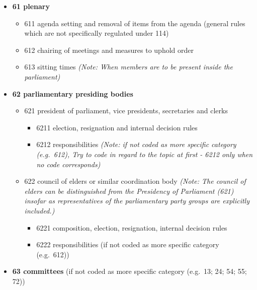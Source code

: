\documentclass[]{article}
\providecommand{\tightlist}{%
  \setlength{\itemsep}{0pt}\setlength{\parskip}{0pt}}
\begin{document}
\begin{itemize}
\tightlist
\item
  \textbf{61 plenary}

  \begin{itemize}
  \tightlist
  \item
    611 agenda setting and removal of items from the agenda (general
    rules which are not specifically regulated under 114)
  \item
    612 chairing of meetings and measures to uphold order
  \item
    613 sitting times \emph{(Note: When members are to be present inside
    the parliament)}
  \end{itemize}
\item
  \textbf{62 parliamentary presiding bodies}

  \begin{itemize}
  \tightlist
  \item
    621 president of parliament, vice presidents, secretaries and clerks

    \begin{itemize}
    \tightlist
    \item
      6211 election, resignation and internal decision rules
    \item
      6212 responsibilities \emph{(Note: if not coded as more specific
      category (e.g.~612), Try to code in regard to the topic at first -
      6212 only when no code corresponds)}
    \end{itemize}
  \item
    622 council of elders or similar coordination body \emph{(Note: The
    council of elders can be distinguished from the Presidency of
    Parliament (621) insofar as representatives of the parliamentary
    party groups are explicitly included.)}

    \begin{itemize}
    \tightlist
    \item
      6221 composition, election, resignation, internal decision rules
    \item
      6222 responsibilities (if not coded as more specific category
      (e.g.~612))
    \end{itemize}
  \end{itemize}
\item
  \textbf{63 committees} (if not coded as more specific category
  (e.g.~13; 24; 54; 55; 72))


\end{itemize}
\end{document}
